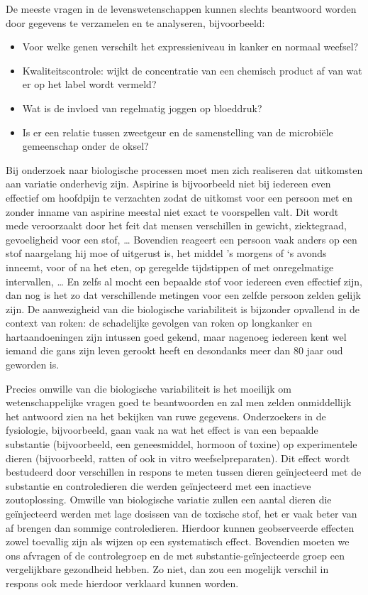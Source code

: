 \documentclass[
  12pt,dutch]{book}
\providecommand{\tightlist}{%
  \setlength{\itemsep}{0pt}\setlength{\parskip}{0pt}}
\theoremstyle{definition}
\theoremstyle{definition}
\theoremstyle{definition}
\theoremstyle{definition}
\theoremstyle{remark}
\begin{document}
De meeste vragen in de levenswetenschappen kunnen slechts beantwoord worden door gegevens te verzamelen en te analyseren, bijvoorbeeld:

\begin{itemize}
\tightlist
\item
  Voor welke genen verschilt het expressieniveau in kanker en normaal weefsel?
\item
  Kwaliteitscontrole: wijkt de concentratie van een chemisch product af van wat er op het label wordt vermeld?\\
\item
  Wat is de invloed van regelmatig joggen op bloeddruk?
\item
  Is er een relatie tussen zweetgeur en de samenstelling van de microbiële gemeenschap onder de oksel?
\end{itemize}

Bij onderzoek naar biologische processen moet men zich realiseren dat uitkomsten aan variatie onderhevig zijn. Aspirine is bijvoorbeeld niet bij iedereen even effectief om hoofdpijn te verzachten zodat de uitkomst voor een persoon met en zonder inname van aspirine meestal niet exact te voorspellen valt. Dit wordt mede veroorzaakt door het feit dat mensen verschillen in gewicht, ziektegraad, gevoeligheid voor een stof, \ldots{} Bovendien reageert een persoon vaak anders op een stof naargelang hij moe of uitgerust is, het middel 's morgens of `s avonds inneemt, voor of na het eten, op geregelde tijdstippen of met onregelmatige intervallen, \ldots{} En zelfs al mocht een bepaalde stof voor iedereen even effectief zijn, dan nog is het zo dat verschillende metingen voor een zelfde persoon zelden gelijk zijn.
De aanwezigheid van die biologische variabiliteit is bijzonder opvallend in de context van roken: de schadelijke gevolgen van roken op longkanker en hartaandoeningen zijn intussen goed gekend, maar nagenoeg iedereen kent wel iemand die gans zijn leven gerookt heeft en desondanks meer dan 80 jaar oud geworden is.

Precies omwille van die biologische variabiliteit is het moeilijk om wetenschappelijke vragen goed te beantwoorden en zal men zelden onmiddellijk het antwoord zien na het bekijken van ruwe gegevens. Onderzoekers in de fysiologie, bijvoorbeeld, gaan vaak na wat het effect is van een bepaalde substantie (bijvoorbeeld, een geneesmiddel, hormoon of toxine) op experimentele dieren (bijvoorbeeld, ratten of ook in vitro weefselpreparaten). Dit effect wordt bestudeerd door verschillen in respons te meten tussen dieren geïnjecteerd met de substantie en controledieren die werden geïnjecteerd met een inactieve zoutoplossing. Omwille van biologische variatie zullen een aantal dieren die geïnjecteerd werden met lage dosissen van de toxische stof, het er vaak beter van af brengen dan sommige controledieren. Hierdoor kunnen geobserveerde effecten zowel toevallig zijn als wijzen op een systematisch effect. Bovendien moeten we ons afvragen of de controlegroep en de met substantie-geïnjecteerde groep een vergelijkbare gezondheid hebben. Zo niet, dan zou een mogelijk verschil in respons ook mede hierdoor verklaard kunnen worden.
\end{document}

